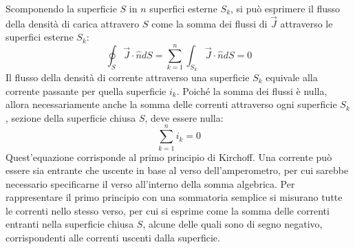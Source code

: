 \documentclass{article}
\numberwithin{equation}{subsection}
\begin{document}
Scomponendo la superficie $S$ in $n$ superfici esterne $S_k$, si può esprimere il flusso della densità di carica attravero $S$ come la somma dei flussi di $\vec{J}$ attraverso 
le superfici esterne $S_k$:
\begin{equation*}
    \displaystyle\oint_{S}\vec{J}\cdot\hat{n}dS=\sum_{k=1}^n\int_{S_k}\vec{J}\cdot\hat{n}dS=0
\end{equation*}
Il flusso della densità di corrente attraverso una superficie $S_k$ equivale alla corrente passante per quella superficie $i_k$. Poiché la somma dei flussi è nulla, allora 
necessariamente anche la somma delle correnti attraverso ogni superficie $S_k$, sezione della superficie chiusa $S$, deve essere nulla:
\begin{equation}
    \displaystyle\sum_{k=1}^ni_k=0
\end{equation}
Quest'equazione corrisponde al primo principio di Kirchoff. Una corrente può essere sia entrante che uscente in base al verso dell'amperometro, per cui sarebbe necessario 
specificarne il verso all'interno della somma algebrica. Per rappresentare il primo principio con una sommatoria semplice si misurano tutte le correnti nello stesso verso, 
per cui si esprime come la somma delle correnti entranti nella superficie chiusa $S$, alcune delle quali sono di segno negativo, corrispondenti alle correnti uscenti dalla 
superficie. 

\begin{center}
\end{center}
\end{document}
